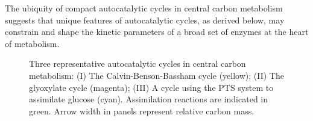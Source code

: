 The ubiquity of compact autocatalytic cycles in central carbon metabolism suggests that unique features of autocatalytic cycles, as derived below, may constrain and shape the kinetic parameters of a broad set of enzymes at the heart of metabolism.

\begin{figure}[h!]
\resizebox{1\linewidth}{!}{
  
}
\caption{
    \label{fig:realautocatal}
Three representative autocatalytic cycles in central carbon metabolism: (I) The Calvin-Benson-Bassham cycle (yellow); (II) The glyoxylate cycle (magenta); (III) A cycle using the PTS system to assimilate glucose (cyan).
Assimilation reactions are indicated in green.
Arrow width in panels represent relative carbon mass.
}
\end{figure}

